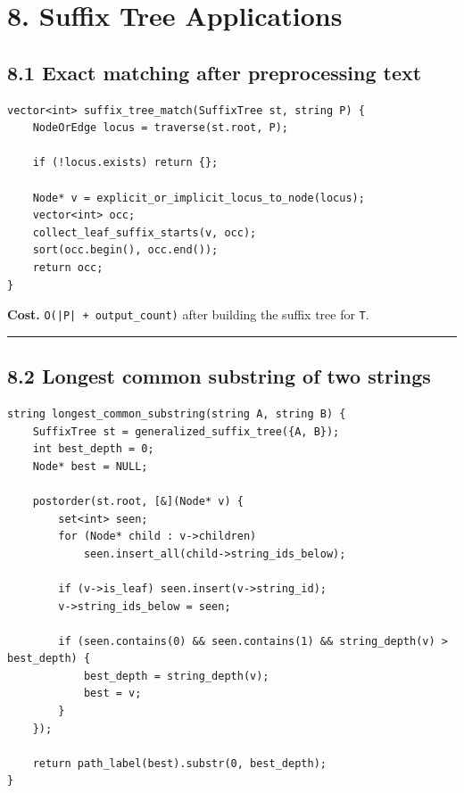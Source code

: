 \documentclass[11pt]{article}
\begin{document}
\section{8. Suffix Tree Applications}\label{suffix-tree-applications}

\subsection{8.1 Exact matching after preprocessing text}\label{exact-matching-after-preprocessing-text}

\begin{verbatim}
vector<int> suffix_tree_match(SuffixTree st, string P) {
    NodeOrEdge locus = traverse(st.root, P);

    if (!locus.exists) return {};

    Node* v = explicit_or_implicit_locus_to_node(locus);
    vector<int> occ;
    collect_leaf_suffix_starts(v, occ);
    sort(occ.begin(), occ.end());
    return occ;
}
\end{verbatim}

\textbf{Cost.} \texttt{O(|P| + output\_count)} after building the suffix tree for \texttt{T}.

\begin{center}\rule{0.5\linewidth}{0.5pt}\end{center}

\subsection{8.2 Longest common substring of two strings}\label{longest-common-substring-of-two-strings}

\begin{verbatim}
string longest_common_substring(string A, string B) {
    SuffixTree st = generalized_suffix_tree({A, B});
    int best_depth = 0;
    Node* best = NULL;

    postorder(st.root, [&](Node* v) {
        set<int> seen;
        for (Node* child : v->children)
            seen.insert_all(child->string_ids_below);

        if (v->is_leaf) seen.insert(v->string_id);
        v->string_ids_below = seen;

        if (seen.contains(0) && seen.contains(1) && string_depth(v) > best_depth) {
            best_depth = string_depth(v);
            best = v;
        }
    });

    return path_label(best).substr(0, best_depth);
}
\end{verbatim}
\end{document}
